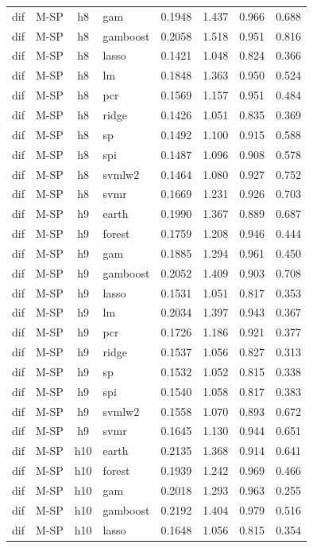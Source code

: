 \begin{ThreePartTable}
\begin{longtable}[t]{llclcccc}
dif & M-SP & h8 & gam & 0.1948 & 1.437 & 0.966 & 0.688\\
dif & M-SP & h8 & gamboost & 0.2058 & 1.518 & 0.951 & 0.816\\
dif & M-SP & h8 & lasso & 0.1421 & 1.048 & 0.824 & 0.366\\
dif & M-SP & h8 & lm & 0.1848 & 1.363 & 0.950 & 0.524\\
dif & M-SP & h8 & pcr & 0.1569 & 1.157 & 0.951 & 0.484\\
dif & M-SP & h8 & ridge & 0.1426 & 1.051 & 0.835 & 0.369\\
dif & M-SP & h8 & sp & 0.1492 & 1.100 & 0.915 & 0.588\\
dif & M-SP & h8 & spi & 0.1487 & 1.096 & 0.908 & 0.578\\
dif & M-SP & h8 & svmlw2 & 0.1464 & 1.080 & 0.927 & 0.752\\
dif & M-SP & h8 & svmr & 0.1669 & 1.231 & 0.926 & 0.703\\
\addlinespace
dif & M-SP & h9 & earth & 0.1990 & 1.367 & 0.889 & 0.687\\
dif & M-SP & h9 & forest & 0.1759 & 1.208 & 0.946 & 0.444\\
dif & M-SP & h9 & gam & 0.1885 & 1.294 & 0.961 & 0.450\\
dif & M-SP & h9 & gamboost & 0.2052 & 1.409 & 0.903 & 0.708\\
dif & M-SP & h9 & lasso & 0.1531 & 1.051 & 0.817 & 0.353\\
dif & M-SP & h9 & lm & 0.2034 & 1.397 & 0.943 & 0.367\\
dif & M-SP & h9 & pcr & 0.1726 & 1.186 & 0.921 & 0.377\\
dif & M-SP & h9 & ridge & 0.1537 & 1.056 & 0.827 & 0.313\\
dif & M-SP & h9 & sp & 0.1532 & 1.052 & 0.815 & 0.338\\
dif & M-SP & h9 & spi & 0.1540 & 1.058 & 0.817 & 0.383\\
dif & M-SP & h9 & svmlw2 & 0.1558 & 1.070 & 0.893 & 0.672\\
dif & M-SP & h9 & svmr & 0.1645 & 1.130 & 0.944 & 0.651\\
\addlinespace
dif & M-SP & h10 & earth & 0.2135 & 1.368 & 0.914 & 0.641\\
dif & M-SP & h10 & forest & 0.1939 & 1.242 & 0.969 & 0.466\\
dif & M-SP & h10 & gam & 0.2018 & 1.293 & 0.963 & 0.255\\
dif & M-SP & h10 & gamboost & 0.2192 & 1.404 & 0.979 & 0.516\\
dif & M-SP & h10 & lasso & 0.1648 & 1.056 & 0.815 & 0.354\\

\end{longtable}
\end{ThreePartTable}
